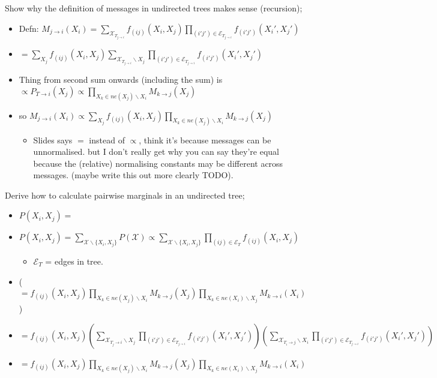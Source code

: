 \documentclass{article}
\begin{document}
Show why the definition of messages in undirected trees makes sense (recursion);  \begin{itemize} \item Defn: $M_{j\rightarrow i}(X_i) =\sum_{\mathcal{X}_{T_{j\rightarrow i}}}f_{(ij)}(X_i, X_j)\prod_{(i'j')\in \mathcal{E}_{T_{j\rightarrow i}}} f_{(i'j')}(X_i', X_j')$ \item $=\sum_{X_j}f_{(ij)}(X_i, X_j)\sum_{\mathcal{X}_{T_{j\rightarrow i}}\backslash X_j}\prod_{(i'j')\in \mathcal{E}_{T_{j\rightarrow i}}} f_{(i'j')}(X_i', X_j')$ \item Thing from second sum onwards (including the sum) is $\propto P_{T\rightarrow i}(X_j)\propto \prod_{X_k\in ne(X_j)\backslash X_i} M_{k\rightarrow j}(X_j)$ \item so $M_{j\rightarrow i}(X_i) \propto \sum_{X_j}f_{(ij)}(X_i, X_j)\prod_{X_k\in ne(X_j)\backslash X_i} M_{k\rightarrow j}(X_j)$ \begin{itemize} \item Slides says $=$ instead of $\propto$, think it's because messages can be unnormalised. but I don't really get why you can say they're equal because the (relative) normalising constants may be different across messages. (maybe write this out more clearly TODO).  \end{itemize} \end{itemize}

Derive how to calculate pairwise marginals in an undirected tree; \begin{itemize} \item $P(X_i, X_j) = $ \item $P(X_i, X_j) = \sum_{\mathcal{X}\backslash\{X_i, X_j\}} P(\mathcal{X}) \propto \sum_{\mathcal{X}\backslash\{X_i, X_j\}}\prod_{(ij)\in \mathcal{E}_T} f_{(ij)}(X_i, X_j)$ \begin{itemize} \item $\mathcal{E}_T$ = edges in tree.  \end{itemize} \item ($=f_{(ij)}(X_i, X_j)\prod_{X_k\in ne(X_j)\backslash X_i}M_{k\rightarrow j}(X_j)\prod_{X_k\in ne(X_i)\backslash X_j}M_{k\rightarrow i}(X_i)$) \item $= f_{(ij)}(X_i, X_j) (\sum_{\mathcal{X}_{T_j\rightarrow i}\backslash X_j} \prod_{(i'j')\in \mathcal{E}_T_{j\rightarrow i}} f_{(i'j')}(X_i', X_j')) (\sum_{\mathcal{X}_{T_i\rightarrow j}\backslash X_i} \prod_{(i'j')\in \mathcal{E}_T_{j\rightarrow i}} f_{(i'j')}(X_i', X_j'))$ \item $= f_{(ij)}(X_i, X_j) \prod_{X_k\in ne(X_j)\backslash X_i}M_{k\rightarrow j}(X_j) \prod_{X_k\in ne(X_i)\backslash X_j}M_{k\rightarrow i}(X_i)$ \end{itemize}
\end{document}
